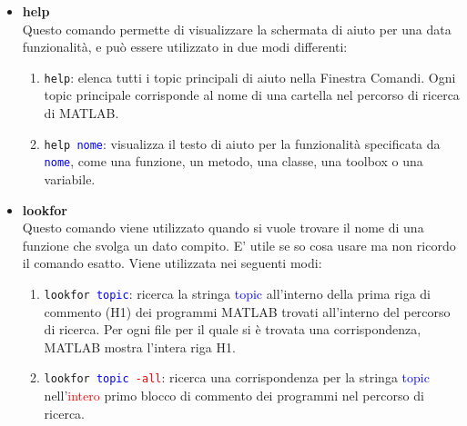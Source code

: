 \begin{itemize}
	
	\item 	\textbf{help} \\ 
		  	Questo comando permette di visualizzare la schermata di aiuto per una data funzionalità, e può essere 
		  	utilizzato in due modi differenti:
		  	\begin{enumerate}
		  	
				\item	\texttt{help}: elenca tutti i topic principali di aiuto nella Finestra Comandi. Ogni topic
						principale corrisponde al nome di una cartella nel percorso di ricerca di MATLAB.
						
				\item	\texttt{help \textcolor{blue}{nome}}: visualizza il testo di aiuto per la funzionalità 
						specificata da \texttt{\textcolor{blue}{nome}}, come una funzione, un metodo, una classe, 
						una toolbox o una variabile.
		  	
		  	\end{enumerate}
		  	
	\item	\textbf{lookfor} \\
			Questo comando viene utilizzato quando si vuole trovare il nome di una funzione che svolga un dato
			compito. E' utile se so cosa usare ma non ricordo il comando esatto. Viene utilizzata nei seguenti modi:
			\begin{enumerate}
			
				\item 	\texttt{lookfor \textcolor{blue}{topic}}: ricerca la stringa \textcolor{blue}{topic}
						all'interno della prima riga di commento (H1) dei programmi MATLAB trovati all'interno del
						percorso di ricerca. Per ogni file per il quale si è trovata una corrispondenza, MATLAB
						mostra l'intera riga H1.
						
				\item 	\texttt{lookfor \textcolor{blue}{topic} \textcolor{red}{-all}}: ricerca una corrispondenza 
						per la stringa \textcolor{blue}{topic} nell'\textcolor{red}{intero} primo blocco di 
						commento dei programmi nel percorso di ricerca.
			\end{enumerate}
        

\end{itemize}
